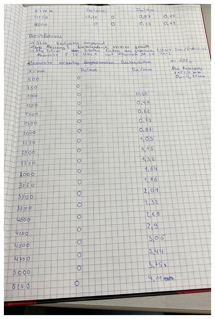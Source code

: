 \begin{figure}[h]
    \centering
    \includegraphics[width=\textwidth]{content/KladdeS3.jpeg}
\end{figure}
